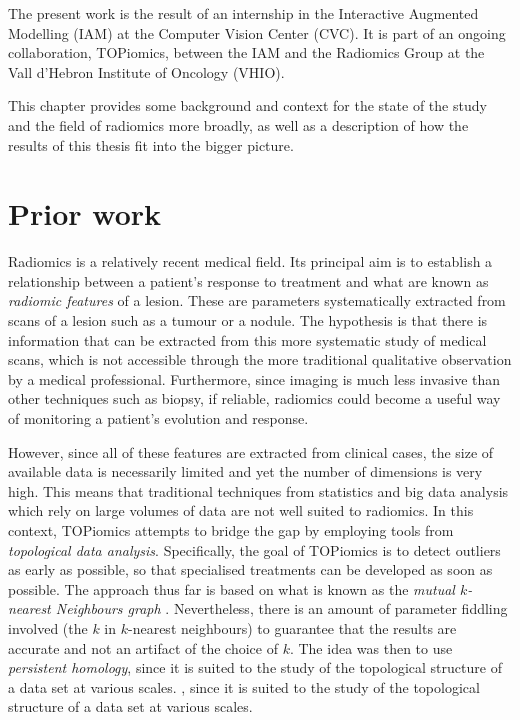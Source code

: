 \documentclass[../main.tex]{subfiles}
\begin{document}
The present work is the result of an internship in the Interactive Augmented Modelling
(IAM) at the Computer Vision Center (CVC). It is part of an ongoing collaboration,
TOPiomics, between the IAM and the Radiomics Group at the Vall d'Hebron Institute of
Oncology (VHIO).  

This chapter provides some background and context for the state of the study and the
field of radiomics more broadly, as well as a description of how the results of this
thesis fit into the bigger picture. 

\section{Prior work}\label{sec:prior work}
Radiomics is a relatively recent medical field. Its principal aim is to establish a
relationship between a patient's response to treatment and what are known as
\emph{radiomic features} of a lesion. These are parameters systematically extracted from
scans of a lesion such as a tumour or a nodule. The hypothesis is that there is information
that can be extracted from this more systematic study of medical scans, which is not
accessible through the more traditional qualitative observation by a medical professional.
Furthermore, since imaging is much less invasive than other techniques such as biopsy, if
reliable, radiomics could become a useful way of monitoring a patient's evolution and
response. 

However, since all of these features are extracted from clinical cases, the size of
available data is necessarily limited and yet the number of dimensions is very high. This
means that traditional techniques from statistics and big data analysis which rely on
large volumes of data are not well suited to radiomics. In this context, TOPiomics
\cite{topiomics, attract} attempts to bridge the gap by employing tools from
\emph{topological data analysis}. Specifically, the goal of TOPiomics is to detect
outliers as early as possible, so that specialised treatments can be developed as soon as
possible. The approach thus far is based on what is known as the \emph{mutual \( k
\)-nearest Neighbours graph} \cite{outliers}. Nevertheless, there is an amount of
parameter fiddling involved (the \( k \) in \( k \)-nearest neighbours)	to guarantee that
the results are accurate and not an artifact of the choice of \( k \). The idea was then
to use \emph{persistent homology}, since it is suited to the study of the topological
structure of a data set at various scales. , since it is suited to the study of the
topological structure of a data set at various scales. 
\end{document}
